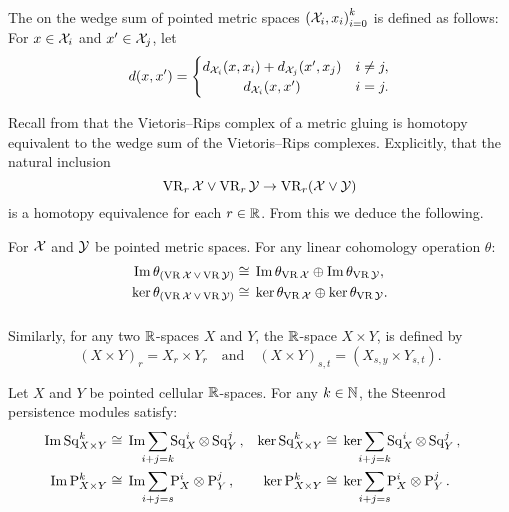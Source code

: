 \subsubsection{}\label{ss:wedge sum}

The  on the wedge sum of pointed metric spaces ${(\mathcal{X}_i, x_i)}_{i = 0}^k$ is defined as follows: For $x \in \mathcal{X}_i$ and $x' \in \mathcal{X}_j$, let
\[
d(x, x') =
\begin{cases}
	d_{\cX_i}(x, x_i) + d_{\cX_j}(x', x_j) & i \neq j, \\
	\hfil d_{\cX_i}(x, x') & i = j.
\end{cases}
\]

Recall from \cite[Proposition 1]{adamaszek2020homotopy} that the Vietoris--Rips complex of a metric gluing is homotopy equivalent to the wedge sum of the Vietoris--Rips complexes.
Explicitly, that the natural inclusion
\[
\operatorname{VR}_r\mathcal{X} \vee \operatorname{VR}_r\mathcal{Y} \to \operatorname{VR}_r(\mathcal{X} \vee \mathcal{Y})
\]
is a homotopy equivalence for each $r \in \mathbb{R}$.
From this we deduce the following.

\medskip\corollary
For $\mathcal{X}$ and $\mathcal{Y}$ be pointed metric spaces.
For any linear cohomology operation $\theta$:
\begin{align*}
	\operatorname{Im}\theta_{(\operatorname{VR} \mathcal{X} \, \vee \, \operatorname{VR} \mathcal{Y})} &\cong \, \operatorname{Im}\theta_{\operatorname{VR} \mathcal{X}} \oplus \operatorname{Im}\theta_{\operatorname{VR} \mathcal{Y}}, \\
	\ker\theta_{(\operatorname{VR} \mathcal{X} \, \vee \, \operatorname{VR} \mathcal{Y})} &\cong \, \ker\theta_{\operatorname{VR} \mathcal{X}} \oplus \ker\theta_{\operatorname{VR} \mathcal{Y}}.
\end{align*}

\subsubsection{}

Similarly, for any two $\mathbb{R}$-spaces $X$ and $Y$, the $\mathbb{R}$-space $X \times Y$, is defined by
\[
(X \times Y)_r = X_r \times Y_r \quad\text{and}\quad (X \times Y)_{s,t} = (X_{s,y} \times Y_{s,t}).
\]

\theorem
Let $X$ and $Y$ be pointed cellular $\mathbb{R}$-spaces.
For any $k \in \mathbb{N}$, the Steenrod persistence modules satisfy:
\begin{align*}
	\img\Sq^k_{X \times Y} &\cong\, \img\sum_{\mathclap{i+j=k}} \Sq^i_X \ot \Sq^j_Y\,, & \ker\Sq^k_{X \times Y} &\cong\, \ker\sum_{\mathclap{i+j=k}} \Sq^i_X \ot \Sq^j_Y\,, \\
	\img\rP^k_{X \times Y} &\cong\, \img\sum_{\mathclap{i+j=s}} \rP^i_X \otimes \rP^j_Y\,, & 
	\ker\rP^k_{X \times Y} &\cong\, \ker\sum_{\mathclap{i+j=s}} \rP^i_X \otimes \rP^j_Y\,. &
\end{align*}

